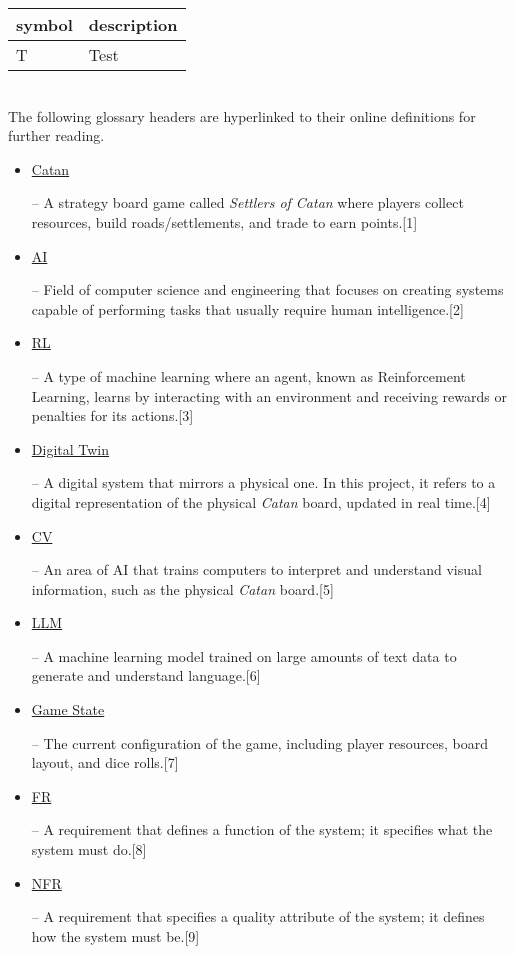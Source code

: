 \documentclass[12pt, titlepage]{article}
\newcommand{\CatanExt}{\href{https://en.wikipedia.org/wiki/Catan}{Catan}}
\newcommand{\AIExt}{\href{https://en.wikipedia.org/wiki/Artificial_intelligence}{AI}}
\newcommand{\RLExt}{\href{https://www.ibm.com/think/topics/reinforcement-learning}{RL}}
\newcommand{\DigitalTwinExt}{\href{https://en.wikipedia.org/wiki/Digital_twin}{Digital Twin}}
\newcommand{\CVExt}{\href{https://www.ibm.com/think/topics/computer-vision}{CV}}
\newcommand{\LLMExt}{\href{https://www.cloudflare.com/learning/ai/what-is-large-language-model/}{LLM}}
\newcommand{\GameStateExt}{\href{https://milvus.io/ai-quick-reference/what-is-a-state-in-rl}{Game State}}
\newcommand{\NFRExt}{\href{https://en.wikipedia.org/wiki/Non-functional_requirement}{NFR}}
\newcommand{\FRExt}{\href{https://en.wikipedia.org/wiki/Functional_requirement}{FR}}
\begin{document}
\renewcommand{\arraystretch}{1.2}
\begin{tabular}{l l} 
  \toprule		
  \textbf{symbol} & \textbf{description}\\
  \midrule 
  T & Test\\
  \bottomrule
\end{tabular}\\


The following glossary headers are hyperlinked to their online definitions for further reading.
\begin{itemize}
    \item \hypertarget{glossary-catan}{\CatanExt{}} – A strategy board game called \textit{Settlers of Catan} where players collect resources, build roads/settlements, and trade to earn points.[1]
    \item \hypertarget{glossary-ai}{\AIExt{}} – Field of computer science and engineering that focuses on creating systems capable of performing tasks that usually require human intelligence.[2]
    \item \hypertarget{glossary-rl}{\RLExt{}} – A type of machine learning where an agent, known as Reinforcement Learning, learns by interacting with an environment and receiving rewards or penalties for its actions.[3]
    \item \hypertarget{glossary-dt}{\DigitalTwinExt{}} – A digital system that mirrors a physical one. In this project, it refers to a digital representation of the physical \emph{Catan} board, updated in real time.[4]
    \item \hypertarget{glossary-cv}{\CVExt{}} – An area of AI that trains computers to interpret and understand visual information, such as the physical \emph{Catan} board.[5]
    \item \hypertarget{glossary-llm}{\LLMExt{}} – A machine learning model trained on large amounts of text data to generate and understand language.[6]
    \item \hypertarget{glossary-gamestate}{\GameStateExt{}} – The current configuration of the game, including player resources, board layout, and dice rolls.[7]
    \item \hypertarget{glossary-fr}{\FRExt{}} – A requirement that defines a function of the system; it specifies what the system must do.[8]
    \item \hypertarget{glossary-nfr}{\NFRExt{}} – A requirement that specifies a quality attribute of the system; it defines how the system must be.[9]
\end{itemize}
\end{document}
